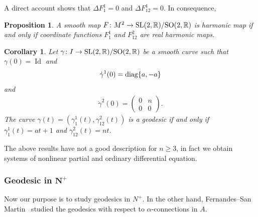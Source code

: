 \documentclass[10pt,a4paper]{amsart}
\numberwithin{equation}{section}
\newtheorem{Corollary}[Theorem]{Corollary}
\newtheorem{Proposition}[Theorem]{Proposition}
{ \theoremstyle{definition}
\newtheorem{Definition}[Theorem]{Definition}
\newtheorem{Example}[Theorem]{Example}
\newtheorem{Remark}[Theorem]{Remark}}
\begin{document}
A direct account shows that $\Delta F^1_{1} =0 $ and $\Delta F^1_{12} = 0$. In consequence,

\begin{Proposition}
  A smooth map $F\colon M^2 \rightarrow {\rm SL}(2,{\mathbb R})/{\rm SO}(2,{\mathbb R})$ is harmonic map if and only if coordinate functions $F^1_1$ and $F^2_{12}$ are real harmonic maps.
\end{Proposition}

\begin{Corollary}
  Let $\gamma\colon I \rightarrow {\rm SL}(2,{\mathbb R})/{\rm SO}(2,{\mathbb R})$ be a smooth curve such that $\gamma(0) = \operatorname{Id}$ and
  \begin{gather*}
    {\dot{\gamma}}^{1}(0) = {\rm diag}\{a,-a\}
  \end{gather*}
  and
  \begin{gather*}
    {\dot{\gamma}}^{2}(0) =
    \left(
    \begin{matrix}
      0 & n\\
      0 & 0
    \end{matrix}
    \right).
  \end{gather*}
  The curve $\gamma(t)=(\gamma^1_1(t),\gamma^2_{12}(t))$ is a geodesic if and only if $\gamma^1_1(t)= at+1$ and $\gamma^2_{12}(t) = nt$.
\end{Corollary}

The above results have not a good description for $n\geq3$, in fact we obtain systems of nonlinear partial and ordinary dif\/ferential equation.

\subsubsection[Geodesic in $N^+$]{Geodesic in $\boldsymbol{N^+}$}

Now our purpose is to study geodesics in  $N^+$. In the other hand,
Fernandes--San Martin~\cite{FernandesM/San-MartinL2} studied the
geodesics with respect to $\alpha$-connections in $A$.
\end{document}
